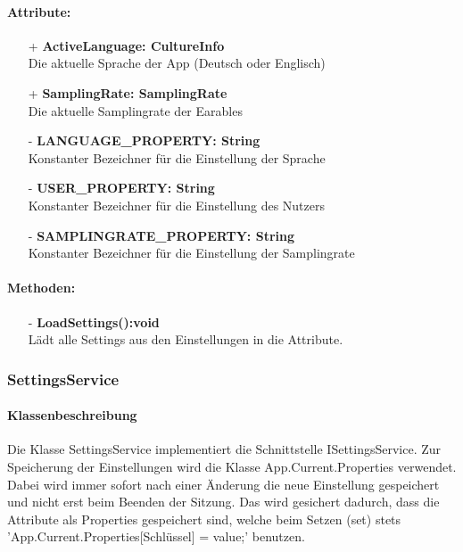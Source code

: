 \documentclass[a4paper,12pt]{article}
\begin{document}
	\paragraph{Attribute:}
	\begin{itemize}
		\item[+] \textbf{ActiveLanguage: CultureInfo}\\Die aktuelle Sprache der App (Deutsch oder Englisch)\\
		\item[+] \textbf{SamplingRate: SamplingRate}\\Die aktuelle Samplingrate der \Gls{Earables} \\ 
		\item[-] \textbf{LANGUAGE\_PROPERTY: String}\\Konstanter Bezeichner für die Einstellung der Sprache \\
		\item[-] \textbf{USER\_PROPERTY: String}\\Konstanter Bezeichner für die Einstellung des Nutzers \\
		\item[-] \textbf{SAMPLINGRATE\_PROPERTY: String}\\Konstanter Bezeichner für die Einstellung der Samplingrate \\
	\end{itemize}
	\paragraph{Methoden:}
	\begin{itemize}
		\item[-] \textbf{LoadSettings():void}\\Lädt alle Settings aus den Einstellungen in die Attribute.	
	\end{itemize}
\subsubsection{SettingsService}
	\paragraph{Klassenbeschreibung}
	Die Klasse SettingsService implementiert die Schnittstelle ISettingsService. Zur Speicherung der Einstellungen wird die Klasse App.Current.Properties verwendet.
	Dabei wird immer sofort nach einer Änderung die neue Einstellung gespeichert und nicht erst beim Beenden der Sitzung.
	Das wird gesichert dadurch, dass die Attribute als Properties gespeichert sind, welche beim Setzen (set) stets 'App.Current.Properties[Schlüssel] = value;' benutzen.
\end{document}
